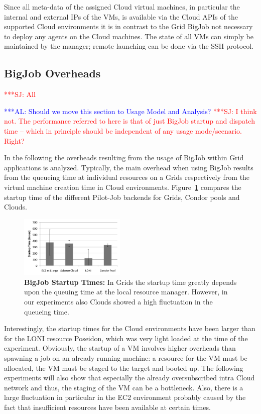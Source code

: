 \documentclass[conference,final]{IEEEtran}
\newcommand{\alnote}[1]{ {\textcolor{blue} { ***AL: #1 }}}
\newcommand{\jhanote}[1]{ {\textcolor{red} { ***SJ: #1 }}}
\newcommand{\alnote}[1]{}
\newcommand{\jhanote}[1]{}
\begin{document}
Since all meta-data of the assigned Cloud virtual machines, in particular the internal
and external IPs of the VMs, is available via the Cloud APIs of the supported Cloud 
environments it is in contrast to the Grid BigJob not necessary to deploy any 
agents on the Cloud machines. The state of all VMs can simply be maintained by the 
manager; remote launching can be done via the SSH protocol.


\subsection{BigJob Overheads} \jhanote{All}

\alnote{Should we move this section to Usage Model and Analysis?}
\jhanote{I think not. The performance referred to here is that of just
  BigJob startup and dispatch time -- which in principle should be
  independent of any usage mode/scenario. Right?}

In the following the overheads resulting from the usage of BigJob within
Grid applications is analyzed. Typically, the main overhead 
when using BigJob results from the queueing time at
individual resources on a Grids respectively from the
virtual machine creation time in Cloud environments. 
Figure~\ref{fig:performance_setup_time} compares the startup time of the
different Pilot-Job backends for Grids, Condor pools and Clouds.
\begin{figure}[htbp]
    \centering
        \includegraphics[width=0.45\textwidth]{performance/setup_time_xls.pdf}
    \caption{\textbf{BigJob Startup Times:} In Grids the startup time
      greatly depends upon the queuing time at the local resource
      manager. However, in our experiments also Clouds showed a high
      fluctuation in the queueing time.}
    \label{fig:performance_setup_time}
\end{figure}

Interestingly, the startup times for the Cloud environments have been larger than 
for the LONI resource Poseidon, which was very light loaded at the time
of the experiment. Obviously, the startup of a VM involves higher overheads 
than spawning a job on an already running machine: a resource for the VM 
must be allocated, the VM must be staged to the target and booted up. The following
experiments will also show that especially the already oversubscribed intra Cloud network
and thus, the staging of the VM can be a bottleneck. Also, there is a
large fluctuation in particular in the EC2 environment probably caused by 
the fact that insufficient resources have been available at certain times.
\end{document}
